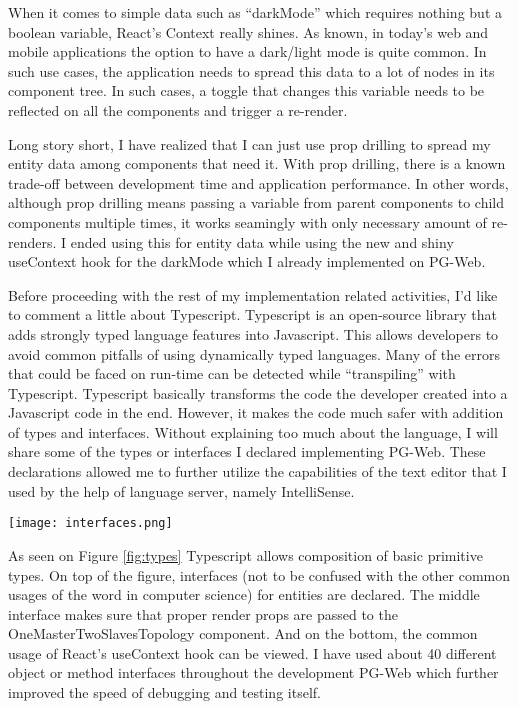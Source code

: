 When it comes to simple data such as ``darkMode'' which requires nothing but 
a boolean variable, React's Context really shines. As known, in today's web 
and mobile applications the option to have a dark/light mode is quite common. 
In such use cases, the application needs to spread this data to a lot of nodes 
in its component tree. In such cases, a toggle that changes this variable 
needs to be reflected on all the components and trigger a re-render.
\par
Long story short, I have realized that I can just use prop drilling to spread 
my entity data among components that need it. With prop drilling, there is a 
known trade-off between development time and application performance. In other 
words, although prop drilling means passing a variable from parent components 
to child components multiple times, it works seamingly with only necessary 
amount of re-renders. I ended using this for entity data while using the new 
and shiny useContext hook for the darkMode which I already implemented on 
PG-Web.
\par
Before proceeding with the rest of my implementation related activities, I'd 
like to comment a little about Typescript. Typescript is an open-source 
library that adds strongly typed language features into Javascript. This 
allows developers to avoid common pitfalls of using dynamically typed 
languages. Many of the errors that could be faced on run-time can be detected 
while ``transpiling'' with Typescript. Typescript basically transforms the 
code the developer created into a Javascript code in the end. However, it 
makes the code much safer with addition of types and interfaces. Without 
explaining too much about the language, I will share some of the types or 
interfaces I declared implementing PG-Web. These declarations allowed me to 
further utilize the capabilities of the text editor that I used by the help 
of language server, namely IntelliSense.

\begin{figure*}[b!]
    \centering
    \texttt{[image: interfaces.png]}
    \caption{Various interfaces that force type checking.}
    \label{fig:types}
\end{figure*}
\pagebreak
As seen on Figure \ref{fig:types} Typescript allows composition of basic 
primitive types. On top of the figure, interfaces (not to be confused with the 
other common usages of the word in computer science) for entities are declared.
The middle interface makes sure that proper render props are passed to the 
OneMasterTwoSlavesTopology component. And on the bottom, the common usage of 
React's useContext hook can be viewed. I have used about 40 different object 
or method interfaces throughout the development PG-Web which further improved 
the speed of debugging and testing itself.
\par
